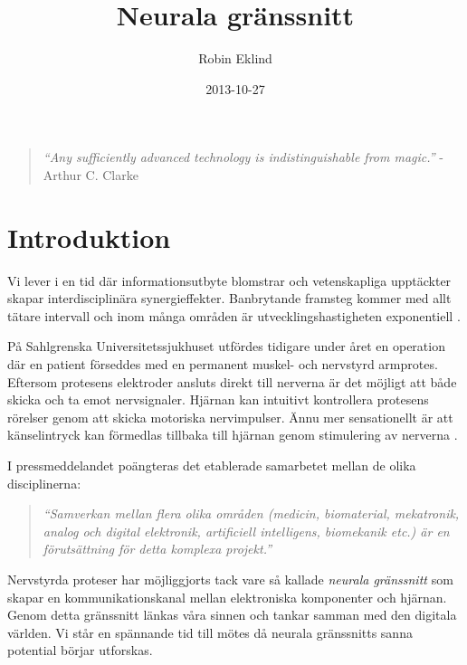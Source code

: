 \documentclass[12pt, a4paper]{article}
\title{Neurala gränssnitt}
\author{Robin Eklind}
\date{2013-10-27}
\begin{document}
\maketitle

\vfill

\begin{quote}
	\textit{``Any sufficiently advanced technology is indistinguishable from magic.''} - \\ Arthur C. Clarke \cite{clarke_quote}
\end{quote}

\pagebreak

\tableofcontents

\pagebreak


\section{Introduktion}

Vi lever i en tid där informationsutbyte blomstrar och vetenskapliga upptäckter skapar interdisciplinära synergieffekter. Banbrytande framsteg kommer med allt tätare intervall och inom många områden är utvecklingshastigheten exponentiell \cite{exponential}.

På Sahlgrenska Universitetssjukhuset utfördes tidigare under året en operation där en patient förseddes med en permanent muskel- och nervstyrd armprotes. Eftersom protesens elektroder ansluts direkt till nerverna är det möjligt att både skicka och ta emot nervsignaler. Hjärnan kan intuitivt kontrollera protesens rörelser genom att skicka motoriska nervimpulser. Ännu mer sensationellt är att känselintryck kan förmedlas tillbaka till hjärnan genom stimulering av nerverna \cite{prosthetic_operation}.

I pressmeddelandet poängteras det etablerade samarbetet mellan de olika disciplinerna:
\begin{quote}
	\textit{``Samverkan mellan flera olika områden (medicin, biomaterial, mekatronik, analog och digital elektronik, artificiell intelligens, biomekanik etc.) är en förutsättning för detta komplexa projekt.''} \cite{prosthetic_operation}
\end{quote}

Nervstyrda proteser har möjliggjorts tack vare så kallade \textit{neurala gränssnitt} som skapar en kommunikationskanal mellan elektroniska komponenter och hjärnan. Genom detta gränssnitt länkas våra sinnen och tankar samman med den digitala världen. Vi står en spännande tid till mötes då neurala gränssnitts sanna potential börjar utforskas.
\end{document}

